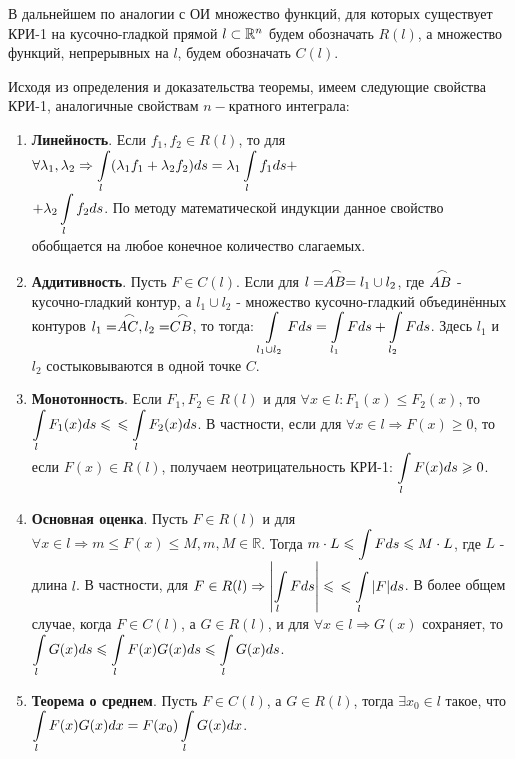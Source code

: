 \begin{notes}
	\item В дальнейшем по аналогии с ОИ множество функций, для которых существует КРИ-1 на кусочно-гладкой прямой $ l \subset \mathbb{R}^n $ будем обозначать ${R} (l) $, а множество функций, непрерывных на $ l $, будем обозначать $ {C}(l) $.
	
	Исходя из определения и доказательства теоремы, имеем следующие свойства КРИ-1, аналогичные свойствам $ n-$кратного интеграла:
	\begin{enumerate}
		\item \textbf{Линейность}. Если $f_1, f_2 \in R(l)$, то для $\forall \lambda_1, \lambda_2 \Rightarrow \displaystyle\int\limits_l (\lambda_1 f_1 + \lambda_2 f_2) ds = \lambda_1 \displaystyle\int\limits_l f_1 ds +$ \\ $ + \lambda_2 \displaystyle\int\limits_l f_2 ds$. По методу математической индукции данное свойство обобщается на любое конечное количество слагаемых.
		
		\item \textbf{Аддитивность}. Пусть $F \in C(l)$. Если для $l = \arc{AB} = l_1 \cup l_2$, где $\arc{AB}$ - кусочно-гладкий контур, а $l_1 \cup l_2$ - множество кусочно-гладкий объединённых контуров $l_1 = \arc{AC}, l_2 = \arc{CB}$, то тогда: $\displaystyle\int\limits_{l_1 \cup l_2} F ds = \displaystyle\int\limits_{l_1} F ds + \displaystyle\int\limits_{l_2} F ds$. Здесь $l_1$ и $l_2$ состыковываются в одной точке $C$.
		
		\item \textbf{Монотонность}. Если $F_1, F_2 \in R(l)$ и для $\forall x \in l: F_1(x) \leqslant F_2(x)$, то $\displaystyle\int\limits_l F_1(x) ds \leqslant$ $\leqslant \displaystyle\int\limits_l F_2 (x) ds$. В частности, если для $\forall x \in l \Rightarrow F(x) \geqslant 0$, то если $F(x) \in R(l)$, получаем неотрицательность КРИ-1: $\displaystyle\int\limits_l F(x) ds \geqslant 0$.
		
		\item \textbf{Основная оценка}. Пусть $F \in R(l)$ и  для $\forall x \in l \Rightarrow m \leqslant F(x) \leqslant M, m, M \in \mathbb{R}$. Тогда $m \cdot L \leqslant \displaystyle\int\limits F ds \leqslant M \cdot L$, где $L$ - длина $l$. В частности, для $F \in R(l) \Rightarrow \left\lvert \displaystyle\int\limits_l F ds \right\rvert \leqslant$ $\leqslant \displaystyle\int\limits_l |F| ds$. В более общем случае, когда $F \in C(l)$, а $G \in R(l)$, и для $\forall x \in l \Rightarrow G(x)$ сохраняет, то $\displaystyle\int\limits_l G(x) ds \leqslant \displaystyle\int\limits_l F(x) G(x) ds \leqslant \displaystyle\int\limits_l G(x) ds$.
		
		\item \textbf{Теорема о среднем}. Пусть $F \in C(l)$, а $G \in R(l)$, тогда $\exists x_0 \in l$ такое, что $\displaystyle\int\limits_l F(x)G(x)dx = F(x_0) \displaystyle\int\limits_l G(x)dx$.
	\end{enumerate}
	

\end{notes}
